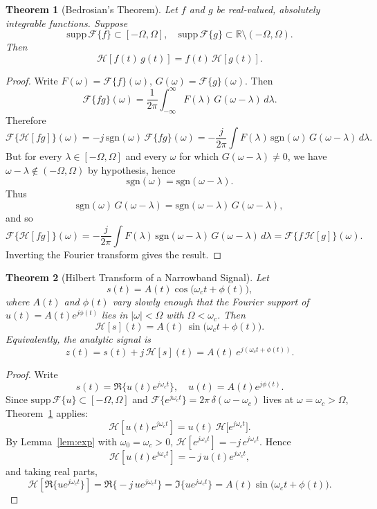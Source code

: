 \documentclass[12pt]{article}
\theoremstyle{plain}
\newtheorem{theorem}{Theorem}[section]
\theoremstyle{definition}
\theoremstyle{remark}
\begin{document}
\begin{theorem}[Bedrosian's Theorem]
\label{thm:bedrosian}
Let $f$ and $g$ be real‐valued, absolutely integrable functions.  Suppose
\[
\mathrm{supp}\,\mathcal{F}\{f\}\subset[-\Omega,\Omega],
\quad
\mathrm{supp}\,\mathcal{F}\{g\}\subset\mathbb{R}\setminus(-\Omega,\Omega).
\]
Then
\[
\mathcal{H}[f(t)\,g(t)]
= f(t)\,\mathcal{H}[g(t)].
\]
\end{theorem}

\begin{proof}
Write $F(\omega)=\mathcal{F}\{f\}(\omega)$, $G(\omega)=\mathcal{F}\{g\}(\omega)$.  Then
\[
\mathcal{F}\{f g\}(\omega)
=\frac1{2\pi}\int_{-\infty}^{\infty} F(\lambda)\,G(\omega-\lambda)\,d\lambda.
\]
Therefore
\[
\mathcal{F}\{\mathcal{H}[f g]\}(\omega)
=-j\,\mathrm{sgn}(\omega)\,\mathcal{F}\{f g\}(\omega)
=-\frac{j}{2\pi}\int F(\lambda)\,\mathrm{sgn}(\omega)\,G(\omega-\lambda)\,d\lambda.
\]
But for every $\lambda\in[-\Omega,\Omega]$ and every $\omega$ for which $G(\omega-\lambda)\neq0$,
we have $\omega-\lambda\notin(-\Omega,\Omega)$ by hypothesis, hence
\[
\mathrm{sgn}(\omega)
=\mathrm{sgn}(\omega-\lambda).
\]
Thus
\[
\mathrm{sgn}(\omega)\,G(\omega-\lambda)
=\mathrm{sgn}(\omega-\lambda)\,G(\omega-\lambda),
\]
and so
\[
\mathcal{F}\{\mathcal{H}[f g]\}(\omega)
=-\frac{j}{2\pi}\int F(\lambda)\,\mathrm{sgn}(\omega-\lambda)\,G(\omega-\lambda)\,d\lambda
=\mathcal{F}\{f\,\mathcal{H}[g]\}(\omega).
\]
Inverting the Fourier transform gives the result.
\end{proof}

\begin{theorem}[Hilbert Transform of a Narrowband Signal]
\label{thm:bandpass}
Let
\[
s(t)=A(t)\cos\bigl(\omega_c t+\phi(t)\bigr),
\]
where $A(t)$ and $\phi(t)$ vary slowly enough that the Fourier support of
$u(t)=A(t)e^{j\phi(t)}$ lies in $|\omega|<\Omega$ with $\Omega<\omega_c$.
Then
\[
\mathcal{H}[s](t)
= A(t)\,\sin\bigl(\omega_c t+\phi(t)\bigr).
\]
Equivalently, the analytic signal is
\[
z(t)=s(t)+j\,\mathcal{H}[s](t)
= A(t)\,e^{j(\omega_c t+\phi(t))}.
\]
\end{theorem}

\begin{proof}
Write
\[
s(t)
=\Re\{u(t)e^{j\omega_c t}\},
\quad
u(t)=A(t)e^{j\phi(t)}.
\]
Since $\mathrm{supp}\,\mathcal{F}\{u\}\subset[-\Omega,\Omega]$ and
$\mathcal{F}\{e^{j\omega_ct}\}=2\pi\,\delta(\omega-\omega_c)$ lives at
$\omega=\omega_c>\Omega$, Theorem~\ref{thm:bedrosian} applies:
\[
\mathcal{H}[u(t)e^{j\omega_ct}]
= u(t)\,\mathcal{H}\bigl[e^{j\omega_ct}\bigr].
\]
By Lemma~\ref{lem:exp} with $\omega_0=\omega_c>0$, 
$\mathcal{H}[e^{j\omega_ct}]=-j\,e^{j\omega_ct}$.  Hence
\[
\mathcal{H}[u(t)e^{j\omega_ct}]
= -\,j\,u(t)e^{j\omega_ct},
\]
and taking real parts,
\[
\mathcal{H}[\Re\{u e^{j\omega_c t}\}]
= \Re\bigl\{-j\,u e^{j\omega_ct}\bigr\}
= \Im\{u e^{j\omega_ct}\}
= A(t)\sin\bigl(\omega_c t+\phi(t)\bigr).
\]
\end{proof}
\end{document}
